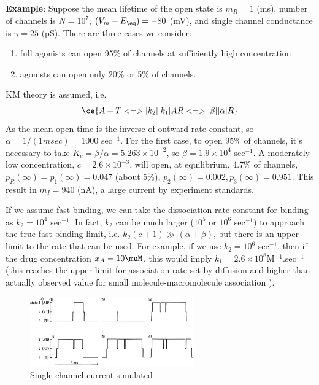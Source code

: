 {\bf Example}:\citep{colquhoun1977rfm} Suppose the mean lifetime of the open
state is $m_R = 1$ (ms), number of channels is $N=10^7$, $(V_m-E_\eq) = -80$
(mV), and single channel conductance is $\gamma = 25$ (pS). There are three
cases we consider:
\begin{enumerate}
  \item  full agonists
can open 95\% of channels at sufficiently high concentration
\item agonists can open only 20\% or 5\% of channels.
\end{enumerate}
KM theory is assumed, i.e.
\begin{equation}
\ce{A + T <=>[k_2][k_1] AR <=>[\beta][\alpha] R}
\end{equation}
As the mean open time is the inverse of outward rate constant, so
$\alpha=1/(1msec) = 1000$ sec$^{-1}$. For the first case, to open 95\% of
channels, it's necessary to take $K_c = \beta/\alpha = 5.263\times 10^{-2}$, so
$\beta = 1.9\times 10^{4}$ sec$^{-1}$. A moderately low concentration,
$c=2.6\times 10^{-3}$, will open, at equilibrium, 4.7\% of channels,
$p_R(\infty)=p_1(\infty)=0.047$ (about 5\%), $p_2(\infty)=0.002, p_3(\infty) =
0.951$. This result in $m_I = 940$ (nA), a large current by experiment standards.

If we assume fast binding, we can take the dissociation rate constant for
binding as $k_2 = 10^4$ sec$^{-1}$. In fact, $k_2$ can be much larger ($10^5$
or $10^6$ sec$^{-1}$) to approach the true fast binding limit, i.e.
$k_2(c+1)\gg (\alpha+\beta)$, but there is an upper limit to the rate that can
be used. For example, if we use $k_2=10^6$ sec$^{-1}$, then if the drug
concentration $x_A=10\muM$, this would imply $k_1=2.6\times
10^8$M$^{-1}$.sec$^{-1}$ (this reaches the upper limit for association rate set
by diffusion and higher than actually observed value for small
molecule-macromolecule association \citep{burgen1966}).

\begin{figure}[hbt]
 \centerline{\includegraphics[height=3cm]{./images/single_channel_current_Colquhoun77.eps}}
\caption{Single channel current simulated}
\label{fig:single_channel_current_Colquhoun}
\end{figure}

